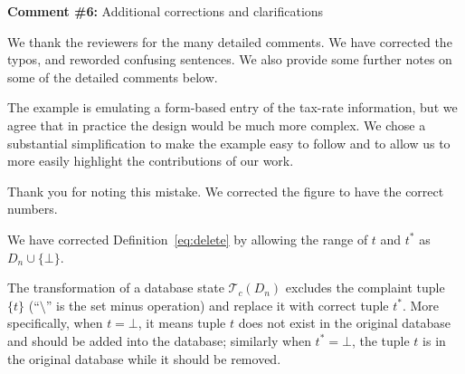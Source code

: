 \noindent
\textbf{Comment \#6:} Additional corrections and clarifications

\smallskip

We thank the reviewers for the many detailed comments. We have corrected the
typos, and reworded confusing sentences. We also provide some further notes on
some of the detailed comments below.

\begin{quote}
\end{quote}

The example is emulating a form-based entry of the tax-rate information, but
we agree that in practice the design would be much more complex. We chose a
substantial simplification to make the example easy to follow and to allow us
to more easily highlight the contributions of our work.

\begin{quote}
\end{quote}

Thank you for noting this mistake. We corrected the figure to have the
correct numbers.


\begin{quote}
\end{quote}

 


\begin{quote}
\end{quote}

We have corrected Definition~\ref{eq:delete} by allowing the range of $t$ and $t^*$ as $D_n \cup \{\bot\}$. 

The transformation of 
a database state $\mathcal{T}_c(D_n)$ excludes the complaint tuple $\{t\}$ (``$\setminus$'' is the set minus operation) 
and replace it with correct tuple $t^*$. More specifically, when $t = \bot$, it means tuple $t$ does not exist in the original
database and should be added into the database; similarly when $t^* = \bot$, the tuple $t$ is in
the original database while it should be removed. 

